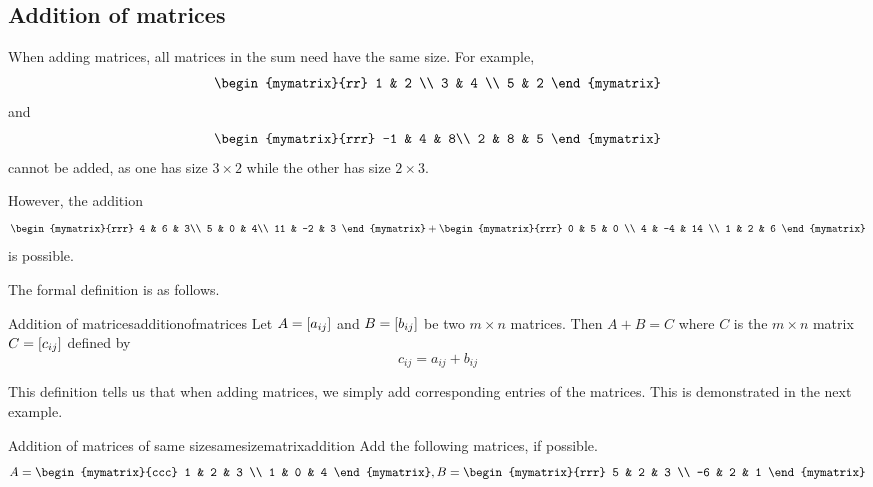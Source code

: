 \subsection{Addition of matrices}

When adding matrices, all matrices in the sum need have the same size.
For example,
\begin{equation*}
\begin{mymatrix}{rr}
1 & 2 \\
3 & 4 \\
5 & 2
\end{mymatrix} 
\end{equation*}
and
\begin{equation*}
\begin{mymatrix}{rrr}
-1 & 4 & 8\\
2 & 8 & 5
\end{mymatrix} 
\end{equation*}
cannot be added, as one has size $3 \times 2$ while the other has size $2 \times 3$.

However, the addition
\begin{equation*}
\begin{mymatrix}{rrr}
4 & 6 & 3\\
5 & 0 & 4\\
11 & -2 & 3
\end{mymatrix} 
+
\begin{mymatrix}{rrr}
0 & 5 & 0 \\
4 & -4 & 14 \\
1 & 2 & 6
\end{mymatrix}
\end{equation*}
is possible.

The formal definition is as follows.

\begin{definition}{Addition of matrices}{additionofmatrices}
Let $A=\left[ a_{ij}\right] $ and $B=\left[ b_{ij}\right] $ be two
$m\times n$ matrices. Then $A+B=C$ where $C$ is the $m \times n$
matrix $C=\left[ c_{ij}\right]$ defined by
\begin{equation*}
c_{ij}=a_{ij}+b_{ij}
\end{equation*}

\end{definition}

This definition tells us that when adding matrices, we simply add corresponding entries of the matrices. 
This is demonstrated in the next example. 

\begin{example}{Addition of matrices of same size}{samesizematrixaddition}
Add the following matrices, if possible.
\begin{equation*}
A = \begin{mymatrix}{ccc}
1 & 2 & 3 \\
1 & 0 & 4
\end{mymatrix},
B = \begin{mymatrix}{rrr}
5 & 2 & 3 \\
-6 & 2 & 1
\end{mymatrix}
\end{equation*}
\end{example}

